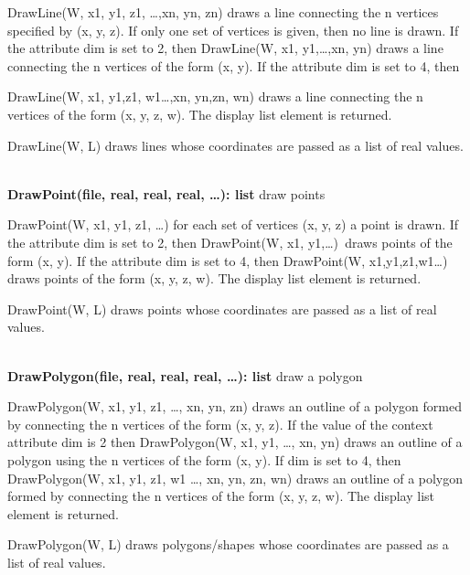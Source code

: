 \documentclass[letterpaper]{article}
\begin{document}
\bigskip

\textsf{DrawLine(W, x1, y1, z1, {\dots},xn, yn, zn)} draws a line
connecting the n vertices specified by (x, y, z). If only one set of
vertices is given, then no line is drawn. If the attribute
\textsf{dim} is set to 2, then
\textsf{DrawLine(W, x1, y1,{\dots},xn, yn)}
draws a line connecting the n vertices of the form (x, y). If
the attribute \textsf{dim} is set to 4, then

\textsf{DrawLine(W, x1, y1,z1, w1{\dots},xn, yn,zn, wn)}
draws a line connecting the n vertices of the form (x, y, z, w).
The display list element is returned.


\bigskip

DrawLine(W, L) draws lines whose coordinates are passed as a list of
real values.

\noindent\hrulefill\\
\noindent\textsf{\textbf{DrawPoint(file, real, real, real, {\dots}): list}}
\hfill draw points


\bigskip

\textsf{DrawPoint(W, x1, y1, z1, {\dots})} for each set of vertices
(x, y, z) a point is drawn. If the attribute \textsf{dim} is set to 2,
then \textsf{DrawPoint(W, x1, y1,{\dots})}\texttt{ }draws points of
the form (x, y). If the attribute \textsf{dim} is set to 4, then
\textsf{DrawPoint(W, x1,y1,z1,w1{\dots}) }draws points of the form (x,
y, z, w). The display list element is returned.


\bigskip

DrawPoint(W, L) draws points whose coordinates are passed as a list of
real values.

\noindent\hrulefill\\
\noindent\textsf{\textbf{DrawPolygon(file, real, real, real, {\dots}): list}}
\hfill draw a polygon


\bigskip

\textsf{DrawPolygon(W, x1, y1, z1, {\dots}, xn, yn, zn)} draws an
outline of a polygon formed by connecting the n vertices of the form
(x, y, z). If the value of the context attribute \textsf{dim} is 2
then \textsf{DrawPolygon(W, x1, y1, {\dots}, xn, yn)} draws an outline
of a polygon using the n vertices of the form (x, y). If
\textsf{dim} is set to 4, then \textsf{DrawPolygon(W, x1, y1, z1, w1
{\dots}, xn, yn, zn, wn)} draws an outline of a polygon formed by
connecting the n vertices of the form (x, y, z, w). The display list
element is returned.

DrawPolygon(W, L) draws polygons/shapes whose coordinates are passed
as a list of real values.
\end{document}
